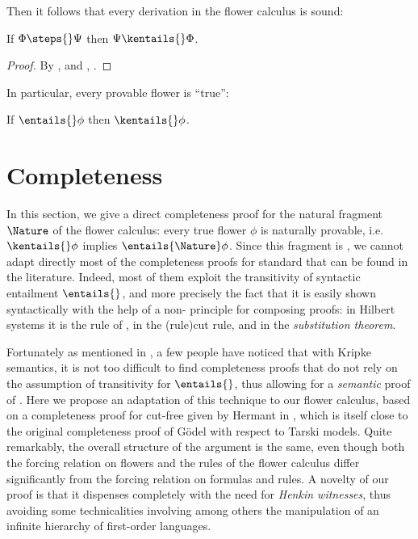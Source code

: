 Then it follows that every derivation in the flower calculus is sound:

\begin{lemma}
  If $\Phi \steps{} \Psi$ then $\Psi \kentails{}\Phi$.
\end{lemma}
\begin{proof}
  By , 
  and , .
\end{proof}

In particular, every provable flower is ``true'':

\begin{theorem}[Soundness]
  If $\entails{} \phi$ then $\kentails{}\phi$.
\end{theorem}

\section{Completeness}

In this section, we give a direct completeness proof for the natural fragment
$\Nature$ of the flower calculus: every true flower $\phi$ is naturally
provable, i.e. $\kentails{}\phi$ implies $\entails{\Nature} \phi$. Since this
fragment is , we cannot adapt directly most of the completeness proofs
for standard  that can be found in the literature. Indeed, most of
them exploit the transitivity of syntactic entailment $\entails{}$, and more
precisely the fact that it is easily shown syntactically with the help of a
non- principle for composing proofs: in Hilbert systems it is the rule
of  , in  the \kl(rule){cut} rule, and
in  the \emph{substitution theorem}.

Fortunately as mentioned in , a few people have noticed that
with Kripke semantics, it is not too difficult to find completeness proofs that
do not rely on the assumption of transitivity for $\entails{}$, thus allowing
for a \emph{semantic} proof of . Here we propose an adaptation of
this technique to our flower calculus, based on a completeness proof for
cut-free  given by Hermant in
, which is itself close to the original
completeness proof of Gödel with respect to  Tarski models. Quite
remarkably, the overall structure of the argument is the same, even though both
the forcing relation on flowers and the rules of the flower calculus differ
significantly from the forcing relation on formulas and  rules.
A novelty of our proof is that it dispenses completely with the need for
\emph{Henkin witnesses}, thus avoiding some technicalities involving among
others the manipulation of an infinite hierarchy of first-order languages.

